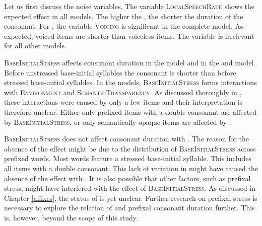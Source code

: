Let us first discuss the noise variables. The variable \textsc{LocalSpeechRate} shows the expected effect in all models.  The higher the , the shorter the duration of the consonant. 
For , the variable \textsc{Voicing} is significant in the complete model. As expected, voiced items are shorter than voiceless items. The variable is irrelevant for all other models.

\textsc{BaseInitialStress} affects consonant duration in the model and in the  and  model. Before unstressed base-initial syllables the consonant is shorter than before stressed base-initial syllables. 
In the models, \textsc{BaseInitialStress} forms interactions with \textsc{Environment} and \textsc{SemanticTransparency}. As discussed thoroughly in , these interactions were caused by only a few items and their interpretation is therefore unclear. Either only prefixed items with a double consonant are affected by \textsc{BaseInitialStress}, or only semantically opaque items are affected by .

 \textsc{BaseInitialStress} does not affect consonant duration with . The reason for the absence of the effect might be due to the distribution of \textsc{BaseInitialStress} across prefixed words. Most words feature a stressed base-initial syllable. This includes all items with a double consonant. This lack of variation in  might have caused the absence of the effect with . It is also possible that other factors, such as prefixal stress, might have interfered with the effect of \textsc{BaseInitialStress}. As discussed in Chapter \ref{affixes}, the  status of  is yet unclear. Further research on prefixal stress is necessary to explore the relation of  and prefixal consonant duration further. This is, however, beyond the scope of this study.

